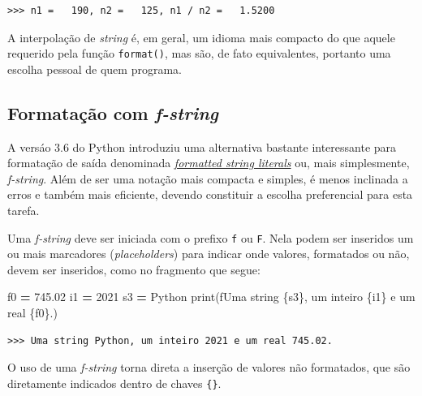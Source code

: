 \documentclass[
]{book}
\newenvironment{Shaded}{\begin{snugshade}}{\end{snugshade}}
\newcommand{\BuiltInTok}[1]{#1}
\newcommand{\DecValTok}[1]{\textcolor[rgb]{0.00,0.00,0.81}{#1}}
\newcommand{\FloatTok}[1]{\textcolor[rgb]{0.00,0.00,0.81}{#1}}
\newcommand{\NormalTok}[1]{#1}
\newcommand{\OperatorTok}[1]{\textcolor[rgb]{0.81,0.36,0.00}{\textbf{#1}}}
\newcommand{\SpecialCharTok}[1]{\textcolor[rgb]{0.00,0.00,0.00}{#1}}
\newcommand{\SpecialStringTok}[1]{\textcolor[rgb]{0.31,0.60,0.02}{#1}}
\newcommand{\StringTok}[1]{\textcolor[rgb]{0.31,0.60,0.02}{#1}}
\begin{document}
\begin{verbatim}
>>> n1 =   190, n2 =   125, n1 / n2 =   1.5200
\end{verbatim}

A interpolação de \emph{string} é, em geral, um idioma mais compacto do que aquele requerido pela função \texttt{format()}, mas são, de fato equivalentes, portanto uma escolha pessoal de quem programa.

\hypertarget{e-s-format-fstring}{%
\subsection{\texorpdfstring{Formatação com \emph{f-string}}{Formatação com f-string}}\label{e-s-format-fstring}}

A versáo 3.6 do Python introduziu uma alternativa bastante interessante para formatação de saída denominada \href{https://docs.python.org/3/tutorial/inputoutput.html\#formatted-string-literals}{\emph{formatted string literals}} ou, mais simplesmente, \emph{f-string}. Além de ser uma notação mais compacta e simples, é menos inclinada a erros e também mais eficiente, devendo constituir a escolha preferencial para esta tarefa.

Uma \emph{f-string} deve ser iniciada com o prefixo \texttt{f} ou \texttt{F}. Nela podem ser inseridos um ou mais marcadores (\emph{placeholders}) para indicar onde valores, formatados ou não, devem ser inseridos, como no fragmento que segue:

\begin{Shaded}
\begin{Highlighting}[]
\NormalTok{f0 }\OperatorTok{=} \FloatTok{745.02}
\NormalTok{i1 }\OperatorTok{=} \DecValTok{2021}
\NormalTok{s3 }\OperatorTok{=} \StringTok{\textquotesingle{}Python\textquotesingle{}}
\BuiltInTok{print}\NormalTok{(}\SpecialStringTok{f\textquotesingle{}Uma string }\SpecialCharTok{\{s3\}}\SpecialStringTok{, um inteiro }\SpecialCharTok{\{i1\}}\SpecialStringTok{ e um real }\SpecialCharTok{\{f0\}}\SpecialStringTok{.\textquotesingle{}}\NormalTok{)}
\end{Highlighting}
\end{Shaded}

\begin{verbatim}
>>> Uma string Python, um inteiro 2021 e um real 745.02.
\end{verbatim}

O uso de uma \emph{f-string} torna direta a inserção de valores não formatados, que são diretamente indicados dentro de chaves \texttt{\{\}}.
\end{document}
